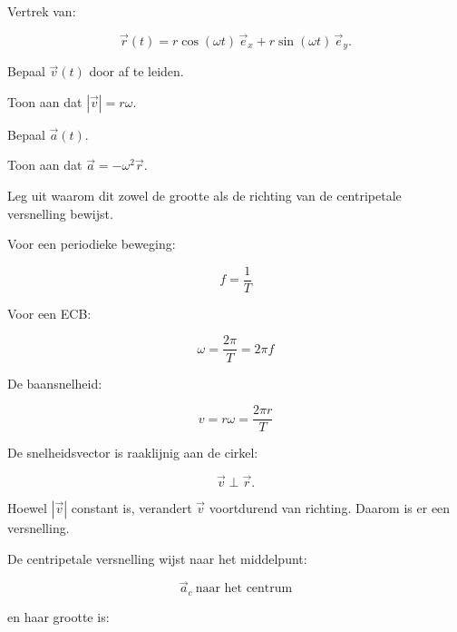 \documentclass{ximera}
\begin{document}
\begin{oefening}{\oefG}

Vertrek van:

\[
\vec r(t)
=
r\cos(\omega t)\,\vec e_x
+
r\sin(\omega t)\,\vec e_y.
\]

\begin{question}
Bepaal $\vec v(t)$ door af te leiden.
\end{question}

\begin{question}
Toon aan dat $|\vec v|=r\omega$.
\end{question}

\begin{question}
Bepaal $\vec a(t)$.
\end{question}

\begin{question}
Toon aan dat $\vec a=-\omega^2\vec r$.
\end{question}

\begin{question}
Leg uit waarom dit zowel de grootte als de richting van de
centripetale versnelling bewijst.
\end{question}

\end{oefening}




Voor een periodieke beweging:

\[
\boxed{
f=\frac1T
}
\]

Voor een ECB:

\[
\boxed{
\omega=\frac{2\pi}{T}=2\pi f
}
\]

De baansnelheid:

\[
\boxed{
v=r\omega=\frac{2\pi r}{T}
}
\]

De snelheidsvector is raaklijnig aan de cirkel:

\[
\boxed{
\vec v\perp\vec r.
}
\]

Hoewel $|\vec v|$ constant is, verandert $\vec v$ voortdurend van
richting. Daarom is er een versnelling.

De centripetale versnelling wijst naar het middelpunt:

\[
\boxed{
\vec a_c\ \text{naar het centrum}
}
\]

en haar grootte is:
\end{document}
